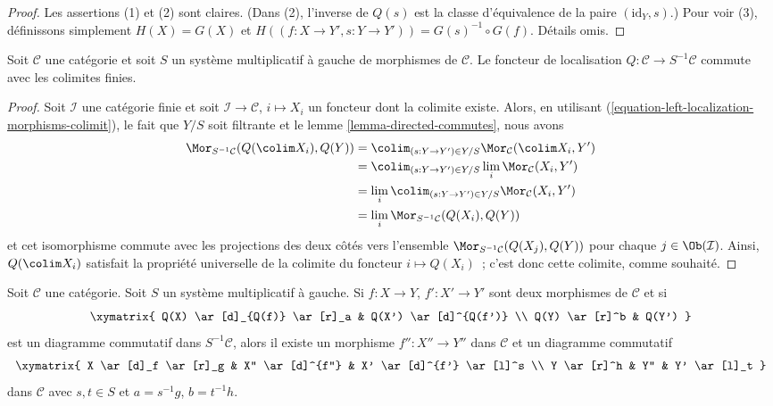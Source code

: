 \begin{proof}
Les assertions (1) et (2) sont claires. (Dans (2), l'inverse de $Q(s)$ est la
classe d'équivalence de la paire $(\text{id}_Y, s)$.) Pour voir (3),
définissons simplement $H(X) = G(X)$ et $H((f : X \to Y', s : Y \to Y')) = G(s)^{-1} \circ G(f)$. Détails omis.
\end{proof}

\begin{lemma}
\label{lemma-left-localization-limits}
Soit $\mathcal{C}$ une catégorie et soit $S$ un système multiplicatif à gauche
de morphismes de $\mathcal{C}$. Le foncteur de localisation $Q : \mathcal{C} \to S^{-1}\mathcal{C}$ commute avec les colimites finies.
\end{lemma}

\begin{proof}
Soit $\mathcal{I}$ une catégorie finie et soit $\mathcal{I} \to \mathcal{C}$,
$i \mapsto X_i$ un foncteur dont la colimite existe. Alors, en utilisant
(\ref{equation-left-localization-morphisms-colimit}), le fait que $Y/S$ soit
filtrante et le lemme \ref{lemma-directed-commutes}, nous avons
\begin{align*}
\Mor_{S^{-1}\mathcal{C}}(Q(\colim X_i), Q(Y))
& =
\colim_{(s : Y \to Y') \in Y/S} \Mor_\mathcal{C}(\colim X_i, Y') \\
& =
\colim_{(s : Y \to Y') \in Y/S} \lim_i \Mor_\mathcal{C}(X_i, Y') \\
& =
\lim_i \colim_{(s : Y \to Y') \in Y/S} \Mor_\mathcal{C}(X_i, Y') \\
& =
\lim_i \Mor_{S^{-1}\mathcal{C}}(Q(X_i), Q(Y))
\end{align*}
et cet isomorphisme commute avec les projections des deux côtés vers
l'ensemble $\Mor_{S^{-1}\mathcal{C}}(Q(X_j), Q(Y))$ pour chaque $j \in \Ob(\mathcal{I})$. Ainsi, $Q(\colim X_i)$ satisfait la propriété universelle
de la colimite du foncteur $i \mapsto Q(X_i)$ ; c’est donc cette colimite,
comme souhaité.
\end{proof}

\begin{lemma}
\label{lemma-left-localization-diagram}
Soit $\mathcal{C}$ une catégorie. Soit $S$ un système multiplicatif à gauche.
Si $f : X \to Y$, $f' : X' \to Y'$ sont deux morphismes de $\mathcal{C}$ et si
$$
\xymatrix{
Q(X) \ar[d]_{Q(f)} \ar[r]_a & Q(X') \ar[d]^{Q(f')} \\
Q(Y) \ar[r]^b & Q(Y')
}
$$
est un diagramme commutatif dans $S^{-1}\mathcal{C}$, alors il existe un
morphisme $f'' : X'' \to Y''$ dans $\mathcal{C}$ et un diagramme commutatif
$$
\xymatrix{
X \ar[d]_f \ar[r]_g & X'' \ar[d]^{f''} & X' \ar[d]^{f'} \ar[l]^s \\
Y \ar[r]^h & Y'' & Y' \ar[l]_t
}
$$
dans $\mathcal{C}$ avec $s, t \in S$ et $a = s^{-1}g$, $b = t^{-1}h$.
\end{lemma}

